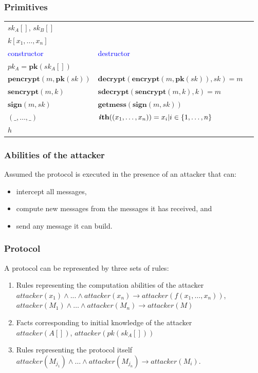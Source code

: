 \documentclass[10pt]{beamer}
\begin{document}
\newcommand{\fun}[1]{\textbf{#1}}

\begin{frame}
  \frametitle{Primitives}

  \begin{tabular}{lll}
    \multicolumn{2}{l}{$sk_A[]$, $sk_B[]$} \\
    \multicolumn{2}{l}{$k[x_1, \dots, x_n]$} \\[0.5em] \hline
    \textcolor{blue}{constructor} & \textcolor{blue}{destructor} \\
    $pk_A = \fun{pk}(sk_A[])$ & \\
    $\fun{pencrypt}(m, \fun{pk}(sk))$ & $\fun{decrypt}(\fun{encrypt}(m, \fun{pk}(sk)), sk) = m$ \\
    $\fun{sencrypt}(m, k)$ & $\fun{sdecrypt}(\fun{sencrypt}(m, k), k) = m$ \\
    $\fun{sign}(m, sk)$ & $\fun{getmess}(\fun{sign}(m, sk))$ \\
    $(\_, \dots, \_)$ & $\fun{\textit{i}th}((x_1, \dots, x_n)) = x_i | i \in \{1, \dots, n\}$ \\
    $h$ &
  \end{tabular}
\end{frame}

\begin{frame}
  \frametitle{Abilities of the attacker}

  Assumed the protocol is executed in the presence of an attacker that can:
  \begin{itemize}
    \item intercept all messages,
    \item compute new messages from the messages it has received, and
    \item send any message it can build.
  \end{itemize}
\end{frame}

\newcommand{\myvspace}{\\[0.5em]}

\begin{frame}
  \frametitle{Protocol}

  A protocol can be represented by three sets of rules:
  \begin{enumerate}
    \item Rules representing the computation abilities of the attacker \myvspace
      $attacker(x_1) \land ... \land attacker(x_n) \rightarrow attacker(f(x_1, \dots, x_n))$, \myvspace
      $attacker(M_1) \land \dots \land attacker(M_n) \rightarrow attacker(M)$ \myvspace
    \item Facts corresponding to initial knowledge of the attacker \myvspace
      $attacker(A[])$, $attacker(pk(sk_A[]))$ \myvspace
    \item Rules representing the protocol itself \myvspace
      $attacker(M_{j_1}) \land \dots \land attacker(M_{j_n}) \rightarrow attacker(M_i)$.
  \end{enumerate}
\end{frame}
\end{document}
